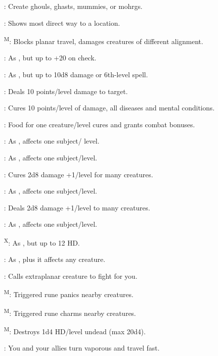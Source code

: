 : Create ghouls, ghasts, mummies, or mohrgs.

: Shows most direct way to a location.

\textsuperscript{M}: Blocks planar travel, damages creatures of different alignment.

: As , but up to +20 on check.

: As , but up to 10d8 damage or 6th-level spell.

: Deals 10 points/level damage to target.

: Cures 10 points/level of damage, all diseases and mental conditions.

: Food for one creature/level cures and grants combat bonuses.

: As , affects one subject/ level.

: As , affects one subject/level.

: Cures 2d8 damage +1/level for many creatures.

: As , affects one subject/level.

: Deals 2d8 damage +1/level to many creatures.

: As , affects one subject/level.

\textsuperscript{X}: As , but up to 12 HD.

: As , plus it affects any creature.

: Calls extraplanar creature to fight for you.

\textsuperscript{M}: Triggered rune panics nearby creatures.

\textsuperscript{M}: Triggered rune charms nearby creatures.

\textsuperscript{M}: Destroys 1d4 HD/level undead (max 20d4).

: You and your allies turn vaporous and travel fast.

